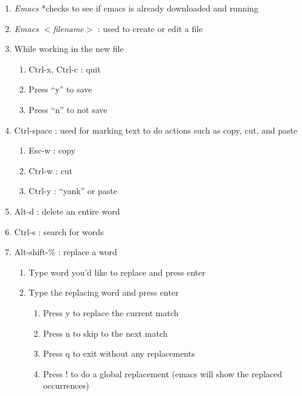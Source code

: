 \documentclass{article} %
\begin{document}
\begin{enumerate}
\item  \textit{Emacs} *checks to see if emacs is already downloaded and running

\item  \textit{Emacs $<$filename$>$} : used to create or edit a file

\item  While working in the new file

\begin{enumerate}
\item  Ctrl-x, Ctrl-c : quit

\item  Press ``y'' to save

\item  Press ``n'' to not save
\end{enumerate}

\item  Ctrl-space : used for marking text to do actions such as copy, cut, and paste

\begin{enumerate}
\item  Esc-w : copy

\item  Ctrl-w : cut

\item  Ctrl-y : ``yank'' or paste
\end{enumerate}

\item  Alt-d : delete an entire word

\item  Ctrl-s : search for words

\item  Alt-shift-\% : replace a word

\begin{enumerate}
\item  Type word you'd like to replace and press enter

\item  Type the replacing word and press enter

\begin{enumerate}
\item  Press y to replace the current match

\item  Press n to skip to the next match

\item  Press q to exit without any replacements

\item  Press ! to do a global replacement (emacs will show the replaced occurrences)
\end{enumerate}
\end{enumerate}
\end{enumerate}
\end{document}
